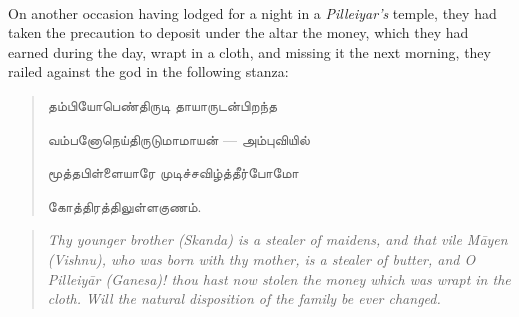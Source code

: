 \documentclass{article}
\newcommand{\TamilText}[1]{\texttamil{#1}}
\newcommand{\tam}[1]{\TamilText{#1}}
\begin{document}
\paragraph{}
On another occasion having lodged for a night in a \emph{Pilleiyar's} temple, they had taken the precaution to deposit under the altar the money, which they had earned during the day, wrapt in a cloth, and missing it the next morning, they railed against the god in the following stanza:
\begin{quotation}\small
\tam{தம்பியோபெண்திருடி தாயாருடன்பிறந்த}

\tam{வம்பனோநெய்திருடுமாமாயன்‌} --- \tam{அம்புவியில்‌}

\tam{மூத்தபிள்ளையாரே முடிச்சவிழ்த்தீர்போமோ}

\tam{கோத்திரத்திலுள்ளகுணம்‌}.
\end{quotation}
\begin{quotation}\small
\emph{Thy younger brother (Skanda) is a stealer of maidens, and that vile M\={a}yen (Vishnu), who was born with thy mother, is a stealer of butter, and O Pilleiy\={a}r (Ganesa)! thou hast now stolen the money which was wrapt in the cloth. Will the natural disposition of the family be ever changed.}
\end{quotation}
\end{document}

